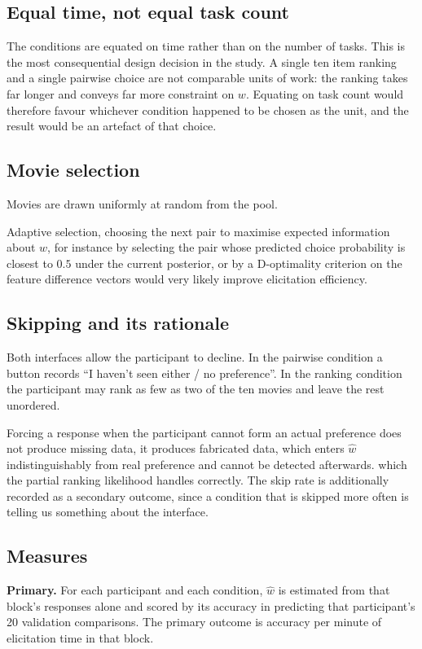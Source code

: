 \documentclass[11pt]{article}
\begin{document}
\subsection{Equal time, not equal task count}
\label{sec:equaltime}
The conditions are equated on time rather than on the number of tasks. This is the most consequential design decision in the study. A single ten item ranking and a single pairwise choice are not comparable units of work: the ranking takes far longer and conveys far more constraint on $w$. Equating on task count would therefore favour whichever condition happened to be chosen as the unit, and the result would be an artefact of that choice.

\subsection{Movie selection}
Movies are drawn uniformly at random from the pool.

Adaptive selection, choosing the next pair to maximise expected information about $w$, for instance by selecting the pair whose predicted choice probability is closest to $0.5$ under the current posterior, or by a D-optimality criterion on the feature difference vectors would very likely improve elicitation efficiency.

\subsection{Skipping and its rationale}
\label{sec:skip}
Both interfaces allow the participant to decline. In the pairwise condition a button records ``I haven't seen either / no preference''. In the ranking condition the participant may rank as few as two of the ten movies and leave the rest unordered.

Forcing a response when the participant cannot form an actual preference does not produce missing data, it produces fabricated data, which enters $\hat{w}$ indistinguishably from real preference and cannot be detected afterwards. which the partial ranking likelihood handles correctly. The skip rate is additionally recorded as a secondary outcome, since a condition that is skipped more often is telling us something about the interface.

\subsection{Measures}
\textbf{Primary.} For each participant and each condition, $\hat{w}$ is estimated from that block's responses alone and scored by its accuracy in predicting that participant's 20 validation comparisons. The primary outcome is accuracy per minute of elicitation time in that block.
\end{document}
